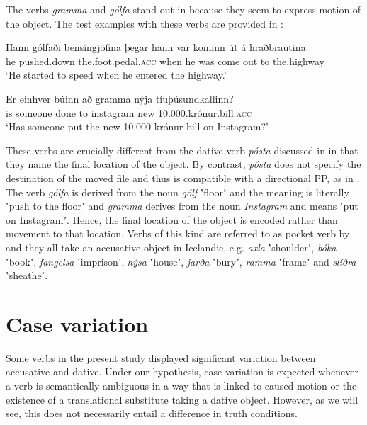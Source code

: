 \documentclass[output=paper,modfonts,nonflat,colorlinks,citecolor=brown]{langsci/langscibook}
\begin{document}
The verbs \textit{gramma} and \textit{gólfa} stand out in  because they seem to express motion of the object. The test examples with these verbs are provided in :



\ea%
    \label{ex:jonsson:6}
    \ea
\gll  Hann  gólfaði  bensíngjöfina  þegar  hann  var  kominn  út  á  hraðbrautina.\\
   he  pushed.down  the.foot.pedal.\textsc{acc}  when  he  was  come  out  to  the.highway\\
   \glt `He started to speed when he entered the highway.'

\ex
\gll   Er  einhver  búinn  að  gramma  nýja  tíuþúsundkallinn?\\
 is  someone  done  to  instagram  new  10.000.krónur.bill.\textsc{acc}\\
\glt `Has someone put the new 10.000 krónur bill on Instagram?'
\z
\z


These verbs are crucially different from the dative verb \textit{pósta} discussed in  in that they name the final location of the object. By contrast, \textit{pósta} does not specify the destination of the moved file and thus is compatible with a directional PP, as in . The verb \textit{gólfa} is derived from the noun \textit{gólf} ʽfloorʼ and the meaning is literally ʽpush to the floorʼ and \textit{gramma} derives from the noun \textit{Instagram} and means ʽput on Instagramʼ. Hence, the final location of the object is encoded rather than movement to that location. Verbs of this kind are referred to as pocket verb by \citet{Levin1993} and they all take an accusative object in Icelandic, e.g. \textit{axla} ʽshoulderʼ, \textit{bóka} ʽbookʼ, \textit{fangelsa} ʽimprisonʼ, \textit{hýsa} ʽhouseʼ, \textit{jarða} ʽburyʼ, \textit{ramma} ʽframeʼ and \textit{slíðra} ʽsheatheʼ.

\section{Case variation}  %
\label{sec:jonsson:4}

Some verbs in the present study displayed significant variation between accusative and dative. Under our hypothesis, case variation is expected whenever a verb is semantically ambiguous in a way that is linked to caused motion or the existence of a translational substitute taking a dative object. However, as we will see, this does not necessarily entail a difference in truth conditions.
\end{document}
